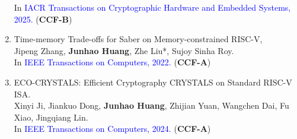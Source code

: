\documentclass[letterpaper,11pt]{article}
\newlength{\outerbordwidth}
\newcommand{\resitem}[1]{\item #1 \vspace{-2pt}}
\newcommand{\resheading}[1]{\vspace{8pt}%
  \parbox{\textwidth}{\setlength{\FrameSep}{\outerbordwidth}
    \begin{shaded}
\setlength{\fboxsep}{0pt}\framebox[\textwidth][l]{\setlength{\fboxsep}{4pt}\fcolorbox{shadecolorB}{shadecolorB}{\textbf{\sffamily{\mbox{~}\makebox[6.762in][l]{\large #1} \vphantom{p\^{E}}}}}}
    \end{shaded}
  }\vspace{-5pt}%
}
\begin{document}
\begin{enumerate}
{		In \textcolor{blue}{IACR Transactions on Cryptographic Hardware and Embedded Systems, 2025.} (\textbf{CCF-B})
	}
	\item {Time-memory Trade-offs for Saber on Memory-constrained RISC-V,\\
	Jipeng Zhang, \textbf{Junhao Huang}, Zhe Liu*, Sujoy Sinha Roy. \\
	In \textcolor{blue}{IEEE Transactions on Computers, 2022.} (\textbf{CCF-A})
	}
	\item {ECO-CRYSTALS: Efficient Cryptography CRYSTALS on Standard RISC-V ISA.\\
	Xinyi Ji, Jiankuo Dong, \textbf{Junhao Huang}, Zhijian Yuan, Wangchen Dai, Fu Xiao, Jingqiang Lin.\\  In \textcolor{blue}{IEEE Transactions on Computers, 2024.} (\textbf{CCF-A})
	}
\end{enumerate}

\end{document}
